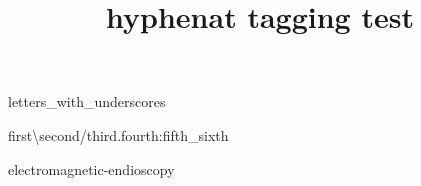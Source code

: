 \documentclass{article}
\title{hyphenat tagging test}
\begin{document}
\kant[1-2]
{\ttfamily\kant[1-2]}
{\nhttfamily\kant[1-2]}
\nohyphens{\kant[1-2]}
letters\_\-with\_\-underscores

first\bshyp{}second\fshyp{}third\dothyp{}fourth\colonhyp{}fifth\_sixth

electromagnetic\hyp{}endioscopy
\end{document}
